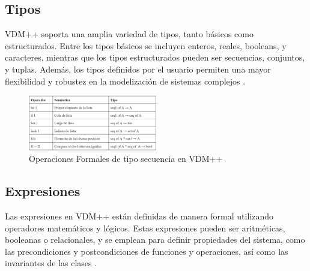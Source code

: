 \subsection{Tipos}
VDM++ soporta una amplia variedad de tipos, tanto básicos como estructurados. Entre los tipos básicos se incluyen enteros, reales, booleans, y caracteres, mientras que los tipos estructurados pueden ser secuencias, conjuntos, y tuplas. Además, los tipos definidos por el usuario permiten una mayor flexibilidad y robustez en la modelización de sistemas complejos \cite{woodcock1996}.

\begin{figure}[h]
    \centering
    \includegraphics[width=0.5\textwidth]{Recursos/tipos_variables_vdmpp.png}
    \caption{Operaciones Formales de tipo secuencia en VDM++}
\end{figure}
\newpage
\subsection{Expresiones}
Las expresiones en VDM++ están definidas de manera formal utilizando operadores matemáticos y lógicos. Estas expresiones pueden ser aritméticas, booleanas o relacionales, y se emplean para definir propiedades del sistema, como las precondiciones y postcondiciones de funciones y operaciones, así como las invariantes de las clases \cite{fitzgerald2009}.



